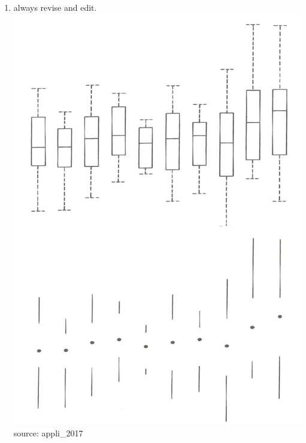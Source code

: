 \documentclass[]{book}
\theoremstyle{definition}
\theoremstyle{definition}
\theoremstyle{definition}
\theoremstyle{remark}
\begin{document}
\begin{enumerate}
\begin{verbatim}
@misc{appli_2017,
author = {{plotly}},
year = {2017},
title = {Maximizing the Data-Ink Ratio in Dashboards and Slide Decks},
howpublished = {\url{https://medium.com/@plotlygraphs/maximizing-the-data-ink-ratio-in-dashboards-and-slide-deck-7887f7c1fab}},
note = {Accessed: 2018-05-07}
} 
\end{verbatim}
\item
  always revise and edit. \includegraphics{images/Tufte_figure4.png}
  source: appli\_2017
\end{enumerate}
\end{document}

